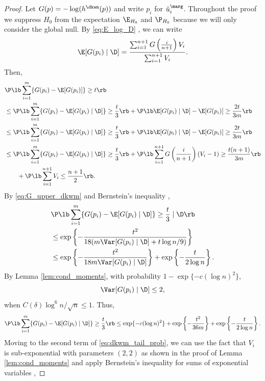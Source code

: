 \begin{proof}
   Let $G(p) = -\log (h^\dkwm(p))$ and write $p_i$ for $\hat{u}^\marg_i$. Throughout the proof we suppress $H_0$ from the expectation $\E_{H_0}$ and $\P_{H_0}$ because we will only consider the global null. By \eqref{eq:E_log_D} , we can write
  \[\E[G(p_i)\mid \D] = \frac{\sum_{i=1}^{n+1}G\left(\frac{i}{n+1}\right)V_{i}}{\sum_{i=1}^{n+1}V_{i}}.\]
  Then,
  \begin{align}
    &\P\lb \sum_{i=1}^{m}\{G(p_i) - \E[G(p_i)]\}\ge t\rb\nonumber\\
    & \le \P\lb \sum_{i=1}^{m}\{G(p_i) - \E[G(p_i)\mid \D]\}\ge \frac{t}{3}\rb + \P\lb \E[G(p_i)\mid \D] - \E[G(p_i)]\ge \frac{2t}{3m}\rb\nonumber\\
    & \le \P\lb \sum_{i=1}^{m}\{G(p_i) - \E[G(p_i)\mid \D]\}\ge \frac{t}{3}\rb + \P\lb \E[G(p_i)\mid \D] - \E[G(p_i)]\ge \frac{2t}{3m}\rb\nonumber\\
    & \le \P\lb \sum_{i=1}^{m}\{G(p_i) - \E[G(p_i)\mid \D]\}\ge \frac{t}{3}\rb + \P\lb \sum_{i=1}^{n+1}G\left(\frac{i}{n+1}\right)(V_{i} - 1)\ge \frac{t(n+1)}{3m}\rb\nonumber\\
    & \qquad+ \P\lb \sum_{i=1}^{n+1}V_{i} \le \frac{n+1}{2}\rb.\label{eq:dkwm_tail_prob}
  \end{align}
  By \eqref{eq:G_upper_dkwm} and Bernstein's inequality \citep[e.g.,][equation (2.10)]{boucheron2013concentration},
  \begin{align*}
    &\P\lb \sum_{i=1}^{m}\{G(p_i) - \E[G(p_i)\mid \D]\}\ge \frac{t}{3}\mid \D\rb\\
    &\le \exp\left\{-\frac{t^2}{18(m\Var[G(p_i)\mid \D] + t\log n / 9)}\right\}\\
    & \le \exp \left\{-\frac{t^2}{18m\Var[G(p_i)\mid \D]}\right\} + \exp\left\{-\frac{t}{2\log n}\right\}.
  \end{align*}
  By Lemma \ref{lem:cond_moments}, with probability $1 - \exp\{-c(\log n)^2\}$,
  \[\Var[G(p_i)\mid \D] \le 2,\]
  when $C(\delta)\log^6 n / \sqrt{n}\le 1$. Thus,
  \begin{align}
    \label{eq:term1_dkwm_tail_prob}
    \P\lb \sum_{i=1}^{m}\{G(p_i) - \E[G(p_i)\mid \D]\}\ge \frac{t}{3}\rb\le \exp\{-c(\log n)^2\} + \exp \left\{-\frac{t^2}{36m}\right\} + \exp\left\{-\frac{t}{2\log n}\right\}.
  \end{align}
  Moving to the second term of \eqref{eq:dkwm_tail_prob}, we can use the fact that $V_i$ is sub-exponential with parameters $(2,2)$ as shown in the proof of Lemma \ref{lem:cond_moments} and apply Bernstein's inequality for sums of exponential variables \citep[e.g.,][Proposition 2.9]{wainwright2019high},

\end{proof}
